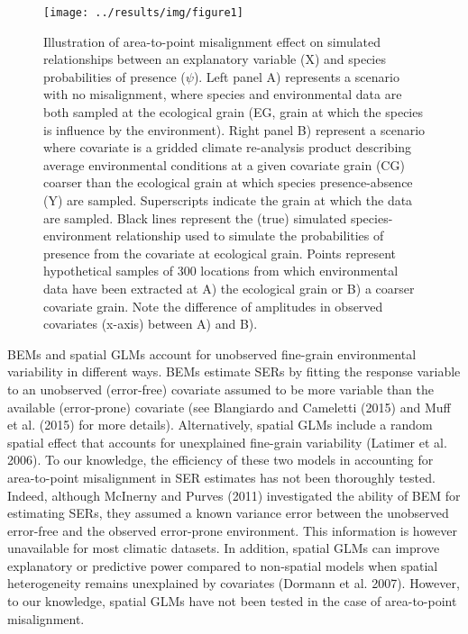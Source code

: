 \documentclass[
  12pt,
  a4paper]{article}
\begin{document}
\begin{figure}[H]

{\centering \texttt{[image: ../results/img/figure1]} 

}

\caption{Illustration of area-to-point misalignment effect on simulated relationships between an explanatory variable (X) and species probabilities of presence ($\psi$). Left panel A) represents a scenario with no misalignment, where species and environmental data are both sampled at the ecological grain (EG, grain at which the species is influence by the environment). Right panel B) represent a scenario where covariate is a gridded climate re-analysis product describing average environmental conditions at a given covariate grain (CG) coarser than the ecological grain at which species presence-absence (Y) are sampled. Superscripts indicate the grain at which the data are sampled. Black lines represent the (true) simulated species-environment relationship used to simulate the probabilities of presence from the covariate at ecological grain. Points represent hypothetical samples of 300 locations from which environmental data have been extracted at A) the ecological grain or B) a coarser covariate grain. Note the difference of amplitudes in observed covariates (x-axis) between A) and B).}\label{fig:fig1}
\end{figure}

BEMs and spatial GLMs account for unobserved fine-grain environmental variability in different ways. BEMs estimate SERs by fitting the response variable to an unobserved (error-free) covariate assumed to be more variable than the available (error-prone) covariate (see Blangiardo and Cameletti (2015) and Muff et al. (2015) for more details). Alternatively, spatial GLMs include a random spatial effect that accounts for unexplained fine-grain variability (Latimer et al. 2006). To our knowledge, the efficiency of these two models in accounting for area-to-point misalignment in SER estimates has not been thoroughly tested. Indeed, although McInerny and Purves (2011) investigated the ability of BEM for estimating SERs, they assumed a known variance error between the unobserved error-free and the observed error-prone environment. This information is however unavailable for most climatic datasets. In addition, spatial GLMs can improve explanatory or predictive power compared to non-spatial models when spatial heterogeneity remains unexplained by covariates (Dormann et al. 2007). However, to our knowledge, spatial GLMs have not been tested in the case of area-to-point misalignment.
\end{document}
